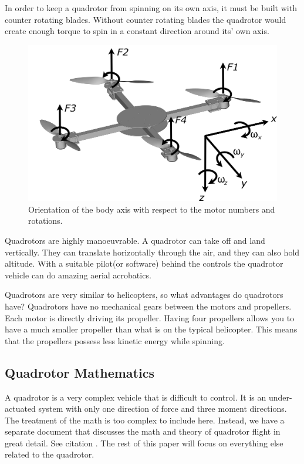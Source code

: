 \documentclass{article}
\numberwithin{equation}{section} %
\begin{document}
In order to keep a quadrotor from spinning on its own axis, it must be built with counter rotating blades. Without counter rotating blades the quadrotor would create enough torque to spin in a constant direction around its' own axis.

\begin{figure}[h!]
  \centering
	\includegraphics[scale=.05]{reference_frame_diagram.jpg}
  \caption{Orientation of the body axis with respect to the motor numbers and rotations.}
\end{figure}  

Quadrotors are highly manoeuvrable. A quadrotor can take off and land vertically. They can translate horizontally through the air, and they can also hold altitude. With a suitable pilot(or software) behind the controls the quadrotor vehicle can do amazing aerial acrobatics.

Quadrotors are very similar to helicopters, so what advantages do quadrotors have? Quadrotors have no mechanical gears between the motors and propellers. Each motor is directly driving its propeller. Having four propellers allows you to have a much smaller propeller than what is on the typical helicopter. This means that the propellers possess less kinetic energy while spinning.

\subsection{Quadrotor Mathematics}
A quadrotor is a very complex vehicle that is difficult to control. It is an under-actuated system with only one direction of force and three moment directions. The treatment of the math is too complex to include here. Instead, we have a separate document that discusses the math and theory of quadrotor flight in great detail. See citation \cite{anzhelka_math}. The rest of this paper will focus on everything else related to the quadrotor.
\end{document}
